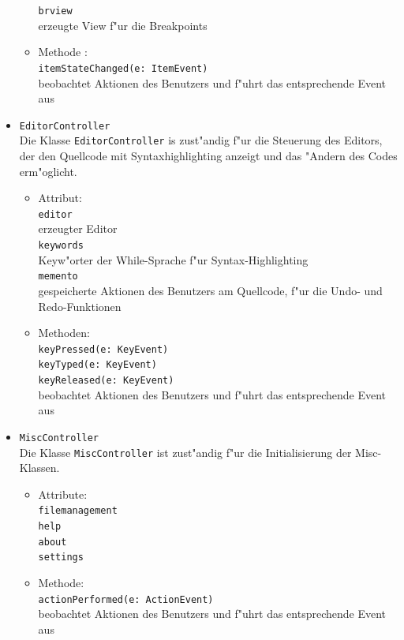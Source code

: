 \documentclass[10pt,a4paper,titlepage]{article}
\begin{document}
\begin{itemize}
\begin{itemize}
\texttt{brview} \\
erzeugte View f"ur die Breakpoints
\item Methode :\\
\texttt{itemStateChanged(e: ItemEvent)} \\
beobachtet Aktionen des Benutzers und f"uhrt das entsprechende Event aus
\end{itemize}
\item \texttt{EditorController} \\
Die Klasse \texttt{EditorController} is zust"andig f"ur die Steuerung des Editors, der den Quellcode mit Syntaxhighlighting anzeigt und das "Andern des Codes erm"oglicht.
\begin{itemize}
\item Attribut: \\
\texttt{editor} \\
erzeugter Editor \\
\texttt{keywords} \\
Keyw"orter der While-Sprache f"ur Syntax-Highlighting \\
\texttt{memento} \\
gespeicherte Aktionen des Benutzers am Quellcode, f"ur die Undo- und Redo-Funktionen
\item Methoden:\\
\texttt{keyPressed(e: KeyEvent)} \\
\texttt{keyTyped(e: KeyEvent)} \\
\texttt{keyReleased(e: KeyEvent)} \\
beobachtet Aktionen des Benutzers und f"uhrt das entsprechende Event aus
\end{itemize}
\item \texttt{MiscController} \\
Die Klasse \texttt{MiscController} ist zust"andig f"ur die Initialisierung der Misc-Klassen. 
\begin{itemize}
\item Attribute: \\
\texttt{filemanagement} \\
\texttt{help} \\
\texttt{about} \\
\texttt{settings}
\item Methode: \\
\texttt{actionPerformed(e: ActionEvent)} \\
beobachtet Aktionen des Benutzers und f"uhrt das entsprechende Event aus
\end{itemize}
\end{itemize}
\end{document}
